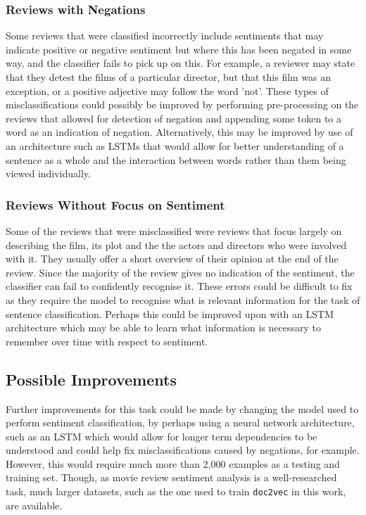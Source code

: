 \documentclass[twocolumn]{article}
\begin{document}
\subsubsection{Reviews with Negations}

Some reviews that were classified incorrectly include sentiments that may indicate positive or negative sentiment but where this has been negated in some way, and the classifier fails to pick up on this. For example, a reviewer may state that they detest the films of a particular director, but that this film was an exception, or a positive adjective may follow the word 'not'. These types of misclassifications could possibly be improved by performing pre-processing on the reviews that allowed for detection of negation and appending some token to a word as an indication of negation. Alternatively, this may be improved by use of an architecture such as LSTMs that would allow for better understanding of a sentence as a whole and the interaction between words rather than them being viewed individually. 

\subsubsection{Reviews Without Focus on Sentiment}

Some of the reviews that were misclassified were reviews that focus largely on describing the film, its plot and the the actors and directors who were involved with it. They usually offer a short overview of their opinion at the end of the review. Since the majority of the review gives no indication of the sentiment, the classifier can fail to confidently recognise it. These errors could be difficult to fix as they require the model to recognise what is relevant information for the task of sentence classification. Perhaps this could be improved upon with an LSTM architecture which may be able to learn what information is necessary to remember over time with respect to sentiment.

\subsection{Possible Improvements}

Further improvements for this task could be made by changing the model used to perform sentiment classification, by perhaps using a neural network architecture, such as an LSTM which would allow for longer term dependencies to be understood and could help fix misclassifications caused by negations, for example. However, this would require much more than 2,000 examples as a testing and training set. Though, as movie review sentiment analysis is a well-researched task, much larger datasets, such as the one used to train \texttt{doc2vec} in this work, are available.
\end{document}
